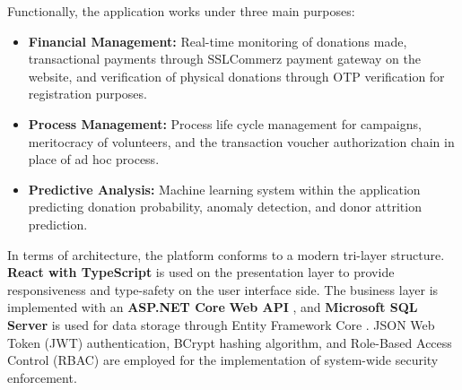 \documentclass{thesis-library}
\begin{document}
Functionally, the application works under three main purposes:
\begin{itemize}
    \item \textbf{Financial Management:} Real-time monitoring of donations made, transactional payments through SSLCommerz \cite{hossain2019e} payment gateway on the website, and verification of physical donations through OTP verification for registration purposes.
    \item \textbf{Process Management:} Process life cycle management for campaigns, meritocracy of volunteers, and the transaction voucher authorization chain in place of ad hoc process.
    \item \textbf{Predictive Analysis:} Machine learning system within the application predicting donation probability, anomaly detection, and donor attrition prediction.
\end{itemize}

In terms of architecture, the platform conforms to a modern tri-layer structure. \textbf{React with TypeScript} \cite{freeman2021react,cherny2019programming} is used on the presentation layer to provide responsiveness and type-safety on the user interface side. The business layer is implemented with an \textbf{ASP.NET Core} \textbf{Web API} \cite{lock2021aspnet,masse2011rest}, and \textbf{Microsoft SQL Server} is used for data storage through Entity Framework Core \cite{lerman2020efcore,coronel2016database}. JSON Web Token (JWT) authentication, BCrypt hashing algorithm, and Role-Based Access Control (RBAC) \cite{sandhu1996rbac} are employed for the implementation of system-wide security enforcement.
\end{document}
